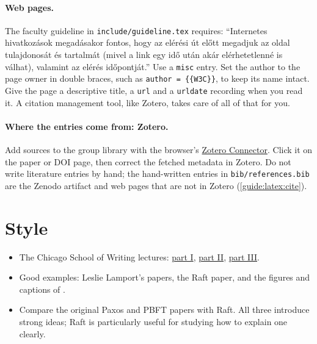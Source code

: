 \paragraph{Web pages.} The faculty guideline in \texttt{include/guideline.tex} requires: \enquote{Internetes hivatkozások megadásakor fontos, hogy az elérési út előtt megadjuk az oldal tulajdonosát és tartalmát (mivel a link egy idő után akár elérhetetlenné is válhat), valamint az elérés időpontját.} Use a \texttt{misc} entry. Set the author to the page owner in double braces, such as \texttt{author = \{\{W3C\}\}}, to keep its name intact. Give the page a descriptive title, a \texttt{url} and a \texttt{urldate} recording when you read it. A citation management tool, like Zotero, takes care of all of that for you.

\paragraph{Where the entries come from: Zotero.} Add sources to the group library with the browser's \href{https://www.zotero.org/download/connectors}{Zotero Connector}. Click it on the paper or DOI page, then correct the fetched metadata in Zotero. Do not write literature entries by hand; the hand-written entries in \texttt{bib/references.bib} are the Zenodo artifact and web pages that are not in Zotero (\cref{guide:latex:cite}).

\section{Style}
\begin{itemize}
  \item The Chicago School of Writing lectures: \href{https://www.youtube.com/watch?v=vtIzMaLkCaM}{part I}, \href{https://www.youtube.com/watch?v=aFwVf5a3pZM}{part II}, \href{https://www.youtube.com/watch?v=gphdfSwYMWU}{part III}.
  \item Good examples: Leslie Lamport's papers, the Raft paper, and the figures and captions of \citet{guide:gulyas2015navigable}.
  \item Compare the original Paxos and PBFT papers with Raft. All three introduce strong ideas; Raft is particularly useful for studying how to explain one clearly.
\end{itemize}

